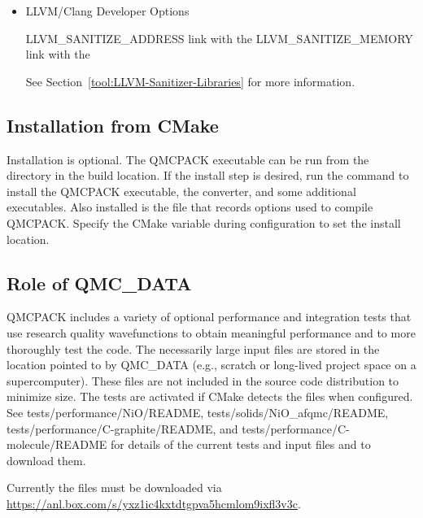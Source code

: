 \begin{itemize}
\item LLVM/Clang Developer Options\\
\begin{shade}
LLVM_SANITIZE_ADDRESS     link with the %
LLVM_SANITIZE_MEMORY      link with the %
\end{shade}

See Section~\ref{tool:LLVM-Sanitizer-Libraries} for more information.
\end{itemize}

\subsection{Installation from CMake}
Installation is optional. The QMCPACK executable can be run from the  directory in the build location.
If the install step is desired, run the  command to install the QMCPACK executable, the converter,
and some additional executables.
Also installed is the  file that records options used to compile QMCPACK.
Specify the  CMake variable during configuration to set the install location.


\subsection{Role of QMC\_DATA}
QMCPACK includes a variety of optional performance and integration
tests that use research quality wavefunctions to obtain meaningful
performance and to more thoroughly test the code. The necessarily
large input files are stored in the location pointed to by QMC\_DATA (e.g., scratch or long-lived project space on a supercomputer). These
files are not included in the source code distribution to minimize
size. The tests are activated if CMake detects the files when
configured. See tests/performance/NiO/README,
tests/solids/NiO\_afqmc/README, tests/performance/C-graphite/README, and tests/performance/C-molecule/README
for details of the current tests and input files and to download them.

Currently the files must be downloaded via \\
\url{https://anl.box.com/s/yxz1ic4kxtdtgpva5hcmlom9ixfl3v3c}.

